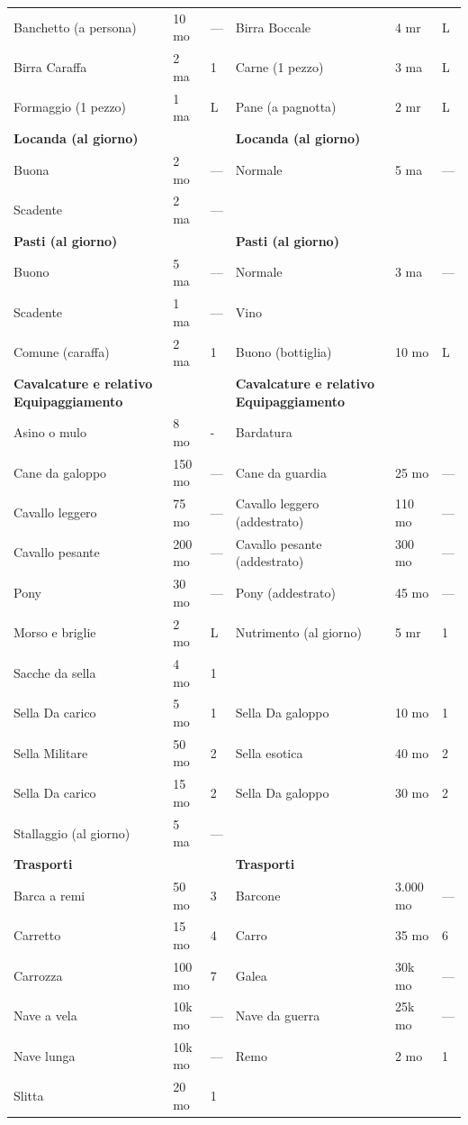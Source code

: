 \documentclass[a4paper,11pt,twoside,openany]{book}
\begin{document}
\begin{tabularx}{0.95\textwidth}{XllXll}
	Banchetto (a persona)   & 10 mo    & —& Birra Boccale& 4 mr& L\\
	Birra Caraffa& 2 ma& 1& Carne (1 pezzo)   & 3 ma& L\\
	Formaggio (1 pezzo)& 1 ma& L&   Pane (a pagnotta) & 2 mr& L\\
	\textbf{Locanda (al giorno)} &&&\textbf{Locanda (al giorno)}&&\\
	Buona & 2 mo& —& Normale& 5 ma& —\\
	Scadente    & 2 ma& —&&&\\
	\textbf{Pasti (al giorno)}    &    & & \textbf{Pasti (al giorno)}    && \\
	Buono & 5 ma& —& Normale& 3 ma& —\\
	Scadente    & 1 ma& —& Vino  && \\
	Comune (caraffa)  & 2 ma& 1& Buono (bottiglia) & 10 mo& L\\
	\textbf{Cavalcature e relativo Equipaggiamento} &    & & \textbf{Cavalcature e relativo Equipaggiamento} && \\
	Asino o mulo& 8 mo& -& Bardatura   && \\
	Cane da galoppo   & 150 mo   & —& Cane da guardia   & 25 mo& —\\
	Cavallo leggero   & 75 mo    & —& Cavallo leggero (addestrato)  & 110 mo    & —\\
	Cavallo pesante   & 200 mo   & —& Cavallo pesante (addestrato)  & 300 mo    & —\\
	Pony  & 30 mo    & —& Pony (addestrato) & 45 mo& —\\
	Morso e briglie   & 2 mo& L& Nutrimento (al giorno)  & 5 mr& 1\\
	Sacche da sella   & 4 mo& 1& && \\
	Sella Da carico   & 5 mo& 1& Sella Da galoppo  & 10 mo& 1\\
	Sella Militare    & 50 mo    & 2& Sella esotica& 40 mo& 2\\
	Sella Da carico   & 15 mo    & 2& Sella Da galoppo  & 30 mo& 2\\
	Stallaggio (al giorno)  & 5 ma& —& && \\
	\textbf{Trasporti}&    & & \textbf{Trasporti}&& \\
	Barca a remi& 50 mo    & 3& Barcone& 3.000 mo  & —\\
	Carretto    & 15 mo    & 4& Carro & 35 mo& 6\\
	Carrozza    & 100 mo   & 7& Galea & 30k mo    & —\\
	Nave a vela & 10k mo   & —& Nave da guerra    & 25k mo    & —\\
	Nave lunga  & 10k mo   & —& Remo  & 2 mo& 1\\
	Slitta& 20 mo    & 1& && \\
\end{tabularx}
\bigskip
\end{document}
